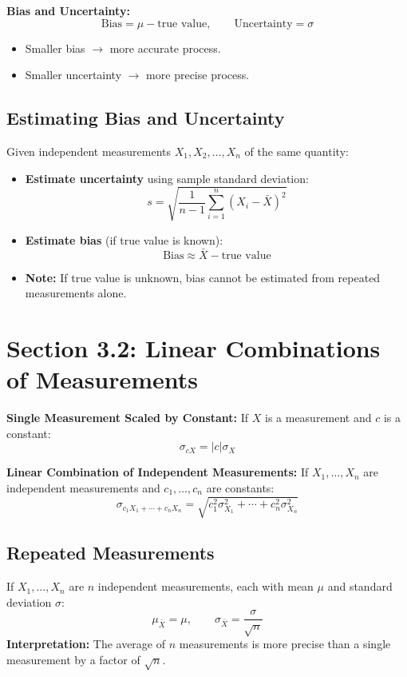 \documentclass[11pt]{article}
\begin{document}
\textbf{Bias and Uncertainty:}
\[
\text{Bias} = \mu - \text{true value},\qquad \text{Uncertainty} = \sigma
\]
\begin{itemize}[nosep]
    \item Smaller bias \(\rightarrow\) more accurate process.
    \item Smaller uncertainty \(\rightarrow\) more precise process.
\end{itemize}

\subsection*{Estimating Bias and Uncertainty}
Given independent measurements \(X_1, X_2, \ldots, X_n\) of the same quantity:
\begin{itemize}[nosep]
    \item \textbf{Estimate uncertainty} using sample standard deviation:
    \[
    s = \sqrt{\frac{1}{n-1}\sum_{i=1}^n (X_i - \bar{X})^2}
    \]
    \item \textbf{Estimate bias} (if true value is known):
    \[
    \text{Bias} \approx \bar{X} - \text{true value}
    \]
    \item \textbf{Note:} If true value is unknown, bias cannot be estimated from repeated measurements alone.
\end{itemize}

\section*{Section 3.2: Linear Combinations of Measurements}
\textbf{Single Measurement Scaled by Constant:}
If \(X\) is a measurement and \(c\) is a constant:
\[
\sigma_{cX} = |c| \sigma_X
\]

\textbf{Linear Combination of Independent Measurements:}
If \(X_1, \dots, X_n\) are independent measurements and \(c_1, \dots, c_n\) are constants:
\[
\sigma_{c_1X_1 + \cdots + c_nX_n} = \sqrt{c_1^2\sigma_{X_1}^2 + \cdots + c_n^2\sigma_{X_n}^2}
\]

\subsection*{Repeated Measurements}
If \(X_1, \dots, X_n\) are \(n\) independent measurements, each with mean \(\mu\) and standard deviation \(\sigma\):
\[
\mu_{\bar{X}} = \mu,\qquad \sigma_{\bar{X}} = \frac{\sigma}{\sqrt{n}}
\]
\textbf{Interpretation:} The average of \(n\) measurements is more precise than a single measurement by a factor of \(\sqrt{n}\).
\end{document}
